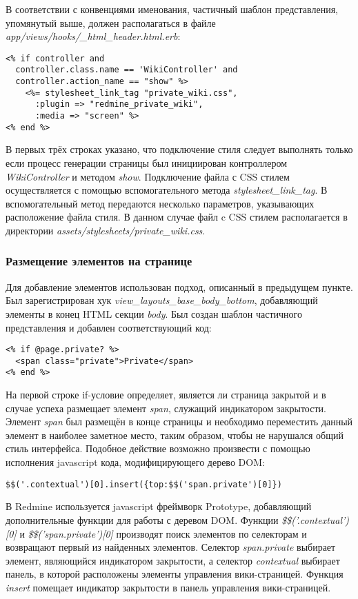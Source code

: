 В соответствии с конвенциями именования, частичный шаблон представления,
упомянутый выше, должен располагаться в файле
\textit{app/views/hooks/\_html\_header.html.erb}:
\small{\begin{lstlisting}
<% if controller and
  controller.class.name == 'WikiController' and
  controller.action_name == "show" %>
    <%= stylesheet_link_tag "private_wiki.css",
      :plugin => "redmine_private_wiki",
      :media => "screen" %>
<% end %>
\end{lstlisting}}
В первых трёх строках указано, что подключение стиля следует выполнять только
если процесс генерации страницы был инициирован контроллером
\textit{WikiController} и методом \textit{show}. Подключение файла с CSS стилем
осуществляется с помощью вспомогательного метода
\textit{stylesheet\_link\_tag}. В вспомогательный метод передаются несколько
параметров, указывающих расположение файла стиля. В данном случае файл c CSS
стилем располагается в директории
\textit{assets/stylesheets/private\_wiki.css}.

\subsubsection{Размещение элементов на странице}
Для добавление элементов использован подход, описанный в предыдущем пункте. Был
зарегистрирован хук \textit{view\_layouts\_base\_body\_bottom}, добавляющий
элементы в конец HTML секции \textit{body}. Был создан шаблон частичного
представления и добавлен соответствующий код:
\small{\begin{lstlisting}
<% if @page.private? %>
  <span class="private">Private</span>
<% end %>
\end{lstlisting}}
На первой строке if-условие определяет, является ли страница закрытой и в
случае успеха размещает элемент \textit{span}, служащий индикатором
закрытости. Элемент \textit{span} был размещён в конце страницы и необходимо
переместить данный элемент в наиболее заметное место, таким образом, чтобы не
нарушался общий стиль интерфейса. Подобное действие возможно произвести с
помощью исполнения javascript кода, модифицирующего дерево DOM:
\small{\begin{lstlisting}
$$('.contextual')[0].insert({top:$$('span.private')[0]})
\end{lstlisting}}
В Redmine используется javascript фреймворк Prototype, добавляющий
дополнительные функции для работы с деревом DOM. Функции
\textit{\$\$('.contextual')[0]} и \textit{\$\$('span.private')[0]} производят
поиск элементов по селекторам и возвращают первый из найденных элементов.
Селектор \textit{span.private} выбирает элемент, являющийся индикатором
закрытости, а селектор \textit{contextual} выбирает панель, в которой
расположены элементы управления вики-страницей. Функция \textit{insert}
помещает индикатор закрытости в панель управления вики-страницей.


